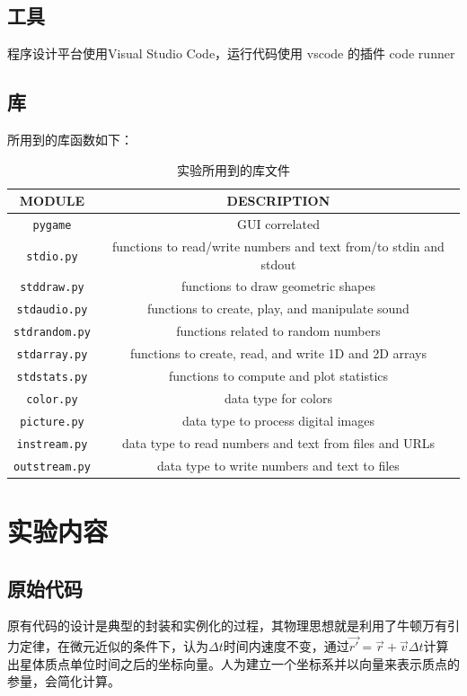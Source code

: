 \documentclass[]{report}
\begin{document}
	\section{工具}
		程序设计平台使用Visual Studio Code，运行代码使用 vscode 的插件 code runner
	\section{库}
		所用到的库函数如下：
		\begin{table}[h]
			\centering
			\caption{实验所用到的库文件}
			\begin{tabular}{c|c}
				\toprule
				MODULE&DESCRIPTION\\
				\midrule
				\verb|pygame|&GUI correlated\\
				\verb|stdio.py|&functions to read/write numbers and text from/to stdin and stdout\\
				\verb|stddraw.py|&functions to draw geometric shapes\\
				\verb|stdaudio.py|&functions to create, play, and manipulate sound\\
				\verb|stdrandom.py|&functions related to random numbers\\
				\verb|stdarray.py|&functions to create, read, and write 1D and 2D arrays\\
				\verb|stdstats.py|&functions to compute and plot statistics\\
				\verb|color.py|&data type for colors\\
				\verb|picture.py|&data type to process digital images\\
				\verb|instream.py|&data type to read numbers and text from files and URLs\\
				\verb|outstream.py|&data type to write numbers and text to files\\
				\bottomrule
			\end{tabular}
		\end{table}

		\newpage
	\chapter{实验内容}
	\section{原始代码}
		原有代码的设计是典型的封装和实例化的过程，其物理思想就是利用了牛顿万有引力定律，在微元近似的条件下，认为$\Delta t$时间内速度不变，通过$\vec{r'}=\vec{r}+\vec{v}\Delta t$计算出星体质点单位时间之后的坐标向量。人为建立一个坐标系并以向量来表示质点的参量，会简化计算。
\end{document}
